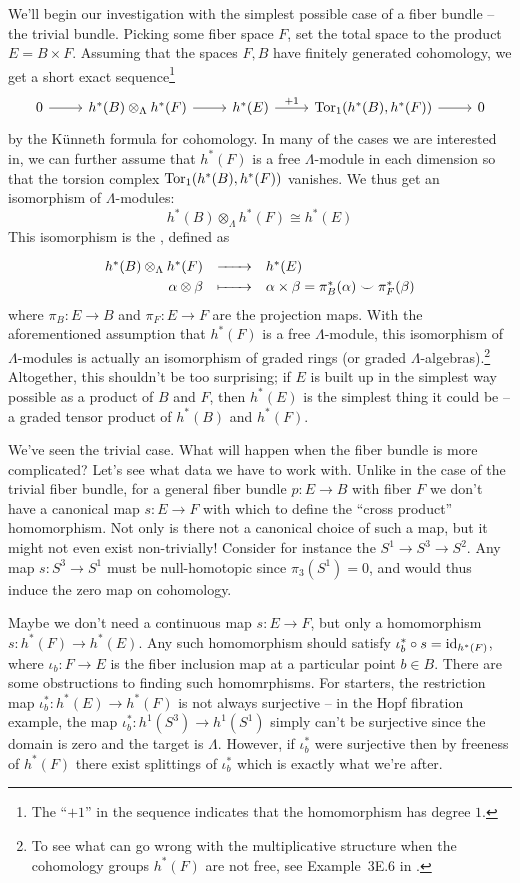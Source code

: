 We'll begin our investigation with the simplest possible case of a fiber bundle -- the trivial bundle. Picking some fiber space $F$, set the total space to the product $E=B\times F$. Assuming that the spaces $F, B$ have finitely generated cohomology, we get a short exact sequence\footnote{The ``$+1$'' in the sequence indicates that the homomorphism has degree $1$.}
\[
  \begin{tikzcd}
    0 \arrow[r] & h^*(B)\otimes_\Lambda h^*(F) \arrow[r] & h^*(E) \arrow[r, "+1"] & \Tor_1(h^*(B), h^*(F)) \arrow[r] & 0
  \end{tikzcd}
\]
by the K\"unneth formula for cohomology. In many of the cases we are interested in, we can further assume that $h^*(F)$ is a free $\Lambda$-module in each dimension so that the torsion complex $\operatorname{Tor}_1(h^*(B), h^*(F))$ vanishes. We thus get an isomorphism of $\Lambda$-modules:
\[h^*(B)\otimes_\Lambda h^*(F)\cong h^*(E)\]
This isomorphism is the , defined as
\[
  \definefunction{}{h^*(B)\otimes_\Lambda h^*(F)}{h^*(E)}{\alpha\otimes \beta}{\alpha\times\beta = \pi_B^*(\alpha)\smile \pi_F^*(\beta)}
\]
where $\pi_B : E \to B$ and $\pi_F : E \to F$ are the projection maps. With the aforementioned assumption that $h^*(F)$ is a free $\Lambda$-module, this isomorphism of $\Lambda$-modules is actually an isomorphism of graded rings (or graded $\Lambda$-algebras).\footnote{To see what can go wrong with the multiplicative structure when the cohomology groups $h^*(F)$ are not free, see Example~3E.6 in \cite{hatcher2002}.
}
Altogether, this shouldn't be too surprising; if $E$ is built up in the simplest way possible as a product of $B$ and $F$, then $h^*(E)$ is the simplest thing it could be -- a graded tensor product of $h^*(B)$ and $h^*(F)$.

We've seen the trivial case. What will happen when the fiber bundle is more complicated? Let's see what data we have to work with. Unlike in the case of the trivial fiber bundle, for a general fiber bundle $p : E \to B$ with fiber $F$ we don't have a canonical map $s : E\to F$ with which to define the ``cross product'' homomorphism. 
Not only is there not a canonical choice of such a map, but it might not even exist non-trivially! Consider for instance the  $S^1\to S^3 \to S^2$. Any map $s : S^3\to S^1$ must be null-homotopic since $\pi_3(S^1)=0$, and would thus induce the zero map on cohomology. 

Maybe we don't need a continuous map $s : E \to F$, but only a homomorphism $s : h^*(F) \to h^*(E)$.
Any such homomorphism should satisfy $\iota_b^*\circ s = \operatorname{id}_{h^*(F)}$, where $\iota_b : F \to E$ is the fiber inclusion map at a particular point $b\in B$. There are some obstructions to finding such homomrphisms. For starters, the restriction map $\iota_b^* : h^*(E) \to h^*(F)$ is not always surjective -- in the Hopf fibration example, the map $\iota_b^* : h^1(S^3) \to h^1(S^1)$ simply can't be surjective since the domain is zero and the target is $\Lambda$. However, if $\iota_b^*$ were surjective then by freeness of $h^*(F)$ there exist splittings of $\iota_b^*$ which is exactly what we're after.


